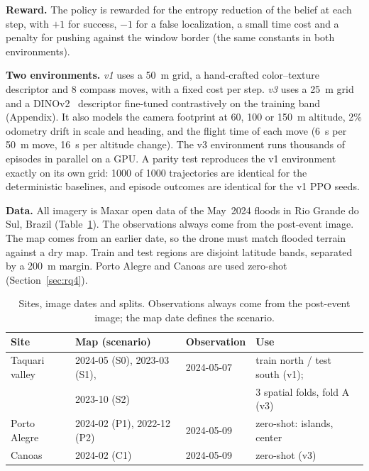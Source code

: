 \textbf{Reward.}
The policy is rewarded for the entropy reduction of the belief at each step, with $+1$ for success, $-1$ for a false localization, a small time cost and a penalty for pushing against the window border (the same constants in both environments).

\textbf{Two environments.}
\emph{v1} uses a 50~m grid, a hand-crafted color--texture descriptor and 8 compass moves, with a fixed cost per step. \emph{v3} uses a 25~m grid and a DINOv2~\cite{oquab2023dinov2} descriptor fine-tuned contrastively on the training band (Appendix). It also models the camera footprint at 60, 100 or 150~m altitude, 2\% odometry drift in scale and heading, and the flight time of each move (6~s per 50~m move, 16~s per altitude change). The v3 environment runs thousands of episodes in parallel on a GPU. A parity test reproduces the v1 environment exactly on its own grid: 1000 of 1000 trajectories are identical for the deterministic baselines, and episode outcomes are identical for the v1 PPO seeds.

\textbf{Data.}
All imagery is Maxar open data of the May~2024 floods in Rio Grande do Sul, Brazil (Table~\ref{tab:sites}). The observations always come from the post-event image. The map comes from an earlier date, so the drone must match flooded terrain against a dry map. Train and test regions are disjoint latitude bands, separated by a 200~m margin. Porto Alegre and Canoas are used zero-shot (Section~\ref{sec:rq4}).

\begin{table}[t]
\centering
\caption{Sites, image dates and splits. Observations always come from the post-event image; the map date defines the scenario.}
\label{tab:sites}
\footnotesize
\setlength{\tabcolsep}{3pt}
\begin{tabular}{@{}llll@{}}
\toprule
Site & Map (scenario) & Observation & Use \\
\midrule
Taquari valley & 2024-05 (S0), 2023-03 (S1), & 2024-05-07 & train north / test south (v1); \\
 & 2023-10 (S2) & & 3 spatial folds, fold A (v3) \\
Porto Alegre & 2024-02 (P1), 2022-12 (P2) & 2024-05-09 & zero-shot: islands, center \\
Canoas & 2024-02 (C1) & 2024-05-09 & zero-shot (v3) \\
\bottomrule
\end{tabular}
\end{table}
